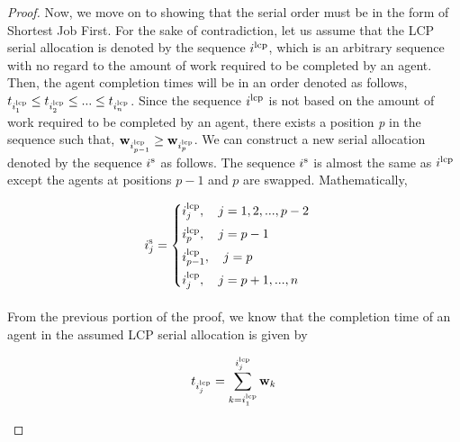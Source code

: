 \documentclass[letterpaper]{article} %
\theoremstyle{definition}
\begin{document}
\begin{proof}
Now, we move on to showing that the serial order must be in the form of Shortest Job First. For the sake of contradiction, let us assume that the LCP serial allocation is denoted by the sequence $i^{\textnormal{lcp}}$, which is an arbitrary sequence with no regard to the amount of work required to be completed by an agent. Then, the agent completion times will be in an order denoted as follows, $t_{i^{\textnormal{lcp}}_{1}} \leq t_{i^{\textnormal{lcp}}_{2}} \leq ... \leq t_{i^{\textnormal{lcp}}_{n}}$. Since the sequence $i^{\textnormal{lcp}}$ is not based on the amount of work required to be completed by an agent, there exists a position \textit{p} in the sequence such that, $\mathbf{w}_{i^{\textnormal{lcp}}_{p-1}} \geq \mathbf{w}_{i^{\textnormal{lcp}}_{p}}$. We can construct a new serial allocation denoted by the sequence $i^{\textnormal{s}}$ as follows. The sequence $i^{\textnormal{s}}$ is almost the same as $i^{\textnormal{lcp}}$ except the agents at positions $p-1$ and $p$ are swapped. Mathematically,
\begin{linenomath}
\begin{equation*}
\begin{split}
i^{\textnormal{s}}_{j} = \begin{cases}
i^{\textnormal{lcp}}_{j}, \quad j = 1,2, ..., p-2 \\[4 pt]
i^{\textnormal{lcp}}_{p}, \quad j = p-1 \\[4 pt]
i^{\textnormal{lcp}}_{p-1}, \quad j = p \\[4 pt]
i^{\textnormal{lcp}}_{j}, \quad j = p+1, ..., n \\
\end{cases}\\[4 pt]    
\end{split}    
\end{equation*}
\end{linenomath}

\noindent From the previous portion of the proof, we know that the completion time of an agent in the assumed LCP serial allocation is given by
\begin{linenomath}
\begin{equation*}
    t_{i^{\textnormal{lcp}}_{j}} =\displaystyle \sum^{i^{\textnormal{lcp}}_{j}}_{k=i^{\textnormal{lcp}}_{1}} \mathbf{w}_{k}
\end{equation*}
\end{linenomath}


\end{proof}
\end{document}
